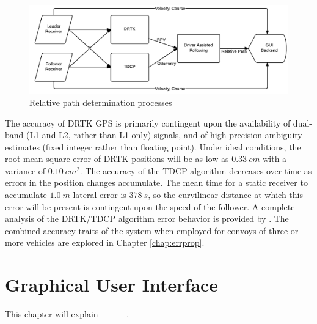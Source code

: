 \documentclass[12pt]{report}
\begin{document}
\begin{figure}[htbp]
    \centering
    \includegraphics[width=6.5in]{./figs/data_algo.png}
    \caption{Relative path determination processes}
    \label{fig:drtktdcp}
\end{figure}

The accuracy of DRTK GPS is primarily contingent upon the availability of dual-band (L1 and L2, rather than L1 only) signals, and of high precision ambiguity estimates (fixed integer rather than floating point). Under ideal conditions, the root-mean-square error of DRTK positions will be as low as $0.33~cm$ with a variance of $0.10~cm^2$. 
The accuracy of the TDCP algorithm decreases over time as errors in the position changes accumulate. The mean time for a static receiver to accumulate $1.0~m$ lateral error is $378~s$, so the curvilinear distance at which this error will be present is contingent upon the speed of the follower. A complete analysis of the DRTK/TDCP algorithm error behavior is provided by \cite{scottthesis}. The combined accuracy traits of the system when employed for convoys of three or more vehicles are explored in Chapter \ref{chap:errprop}.


\chapter{Graphical User Interface}

This chapter will explain ____.

\end{document}
